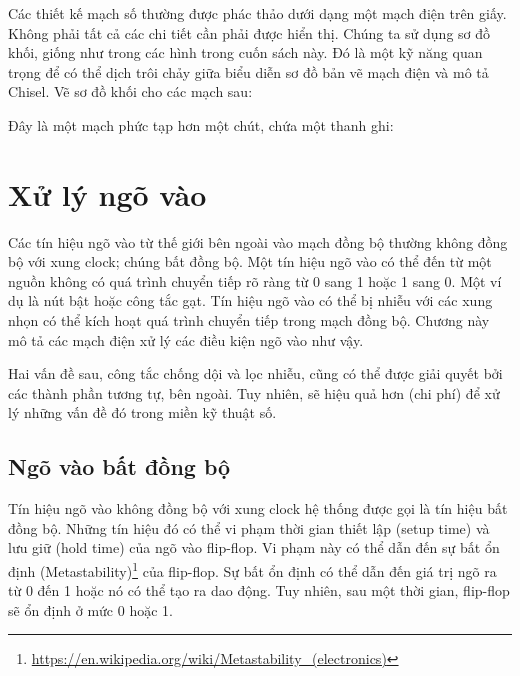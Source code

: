 \documentclass[%
    10pt,
    headinclude, footexclude,
    openright, %
    notitlepage,
    cleardoubleempty,
    headsepline,
    pointlessnumbers,
    bibtotoc, idxtotoc,
    ]{scrbook}
\newcommand{\todo}[1]{{\emph{TODO: #1}}}
\newcommand{\myref}[2]{\href{#1}{#2}}
\renewcommand{\myref}[2]{{#2}{\footnote{\url{#1}}}}
\renewcommand{\todo}[1]{}
\begin{document}
Các thiết kế mạch số thường được phác thảo dưới dạng một mạch điện trên giấy. Không phải tất cả các chi tiết cần phải được hiển thị.
Chúng ta sử dụng sơ đồ khối, giống như trong các hình trong cuốn sách này. Đó là một kỹ năng quan trọng để có thể dịch trôi chảy giữa biểu diễn sơ đồ bản vẽ mạch điện và mô tả Chisel.
Vẽ sơ đồ khối cho các mạch sau: 


\noindent Đây là một mạch phức tạp hơn một chút, chứa một thanh ghi:


\todo{Luca: More exercises would be nice. Maybe in the future?}

\chapter{Xử lý ngõ vào}

Các tín hiệu ngõ vào từ thế giới bên ngoài vào mạch đồng bộ thường không đồng bộ với xung clock; chúng bất đồng bộ. Một tín hiệu ngõ vào có thể đến từ một nguồn không có quá trình chuyển tiếp rõ ràng từ 0 sang 1 hoặc 1 sang 0. Một ví dụ là nút bật hoặc công tắc gạt. Tín hiệu ngõ vào có thể bị nhiễu với các xung nhọn có thể kích hoạt quá trình chuyển tiếp trong mạch đồng bộ. Chương này mô tả các mạch điện xử lý các điều kiện ngõ vào như vậy.

Hai vấn đề sau, công tắc chống dội và lọc nhiễu, cũng có thể được giải quyết bởi các thành phần tương tự, bên ngoài. Tuy nhiên, sẽ hiệu quả hơn (chi phí) để xử lý những vấn đề đó trong miền kỹ thuật số. 

\section{Ngõ vào bất đồng bộ}


\todo{read Dally on this topic to check for correct wording and facts.}

Tín hiệu ngõ vào không đồng bộ với xung clock hệ thống được gọi là tín hiệu bất đồng bộ. Những tín hiệu đó có thể vi phạm thời gian thiết lập (setup time) và lưu giữ (hold time) của ngõ vào flip-flop. Vi phạm này có thể dẫn đến \myref{https://en.wikipedia.org/wiki/Metastability_(electronics)}{sự bất ổn định (Metastability)} của flip-flop. Sự bất ổn định có thể dẫn đến giá trị ngõ ra từ 0 đến 1 hoặc nó có thể tạo ra dao động. Tuy nhiên, sau một thời gian, flip-flop sẽ ổn định ở mức 0 hoặc 1.
\end{document}
